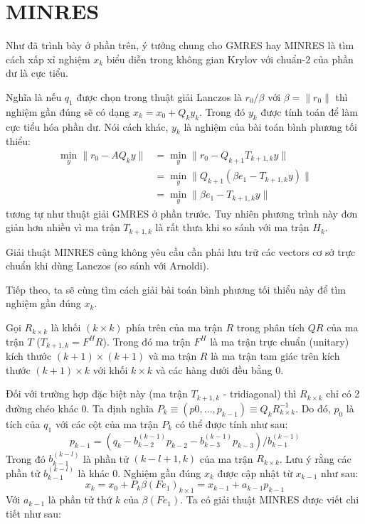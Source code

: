 \section{MINRES}
Như đã trình bày ở phần trên, ý tưởng chung cho GMRES hay MINRES là tìm cách xấp
xỉ nghiệm $x_k$ biểu diễn trong không gian Krylov với chuẩn-2 của phần dư là cực tiểu.

Nghĩa là nếu $q_1$ được chọn trong thuật giải Lanczos là $r_0/\beta$ với 
$\beta = \|r_0\|$ thì nghiệm gần đúng sẽ có dạng $x_k = x_0 + Q_ky_k$. Trong đó
$y_k$ được tính toán để làm cực tiểu hóa phần dư. Nói cách khác, $y_k$ là nghiệm
của bài toán bình phương tối thiểu:
\begin{equation}
    \begin{split}
        \min_y \|r_0 - AQ_ky\| &= \min_y \|r_0 - Q_{k+1}T_{k+1, k}y\| \\
        &= \min_y \|Q_{k+1}(\beta e_1 - T_{k+1,k}y)\| \\
        &= \min_y \|\beta e_1 - T_{k+1,k}y\|
    \end{split}
\end{equation}
tương tự như thuật giải GMRES ở phần trước. Tuy nhiên phương trình này đơn giản hơn nhiều 
vì ma trận $T_{k+1,k}$ là rất thưa khi so sánh với ma trận $H_k$.

Giải thuật MINRES cũng không yêu cầu cần phải lưu trữ các vectors cơ sở trực chuẩn 
khi dùng Lanczos (so sánh với Arnoldi). 

Tiếp theo, ta sẽ cùng tìm cách giải bài toán bình phương tối thiểu này để tìm nghiệm 
gần đúng $x_k$.

Gọi $R_{k \times k}$ là khối $(k \times k)$ phía trên của ma trận $R$ trong phân tích $QR$
của ma trận $T$ ($T_{k+1, k} = F^HR$). Trong đó ma trận $F^H$ là ma trận trực chuẩn (unitary)
kích thước $(k+1) \times (k+1)$ và ma trận $R$ là ma trận tam giác trên kích thước $(k+1) \times k$
với khối $k \times k$ và các hàng dưới đều bằng $0$.

Đối với trường hợp đặc biệt này (ma trận $T_{k+1,k}$ - tridiagonal) thì $R_{k \times k}$ chỉ có 2 đường chéo khác $0$.
Ta định nghĩa $P_k \equiv (p0, ..., p_{k-1}) \equiv Q_kR_{k \times k}^{-1}$. 
Do đó, $p_0$ là tích của $q_1$ với các cột của ma trận $P_k$ có thể được tính như sau:
\begin{equation}
    p_{k-1} = \left(q_k - b_{k-2}^{(k-1)} p_{k-2} - b_{k-3}^{(k-1)} p_{k-3}\right) / b_{k-1}^{(k-1)}
\end{equation}
Trong đó $b_{k-1}^{(k-l)}$ là phần tử $(k-l+1,k)$ của ma trận $R_{k \times k}$. Lưu ý rằng các phần tử
$b_{k-1}^{(k-l)}$ là khác $0$. Nghiệm gần đúng $x_k$ được cập nhật từ $x_{k-1}$ như sau:
\begin{equation}
    x_k = x_0 + P_k \beta (Fe_1)_{k \times 1} = x_{k-1} + a_{k-1}p_{k-1}
\end{equation}
Với $a_{k-1}$ là phần tử thứ $k$ của $\beta (Fe_1)$.
Ta có giải thuật MINRES được viết chi tiết như sau:

